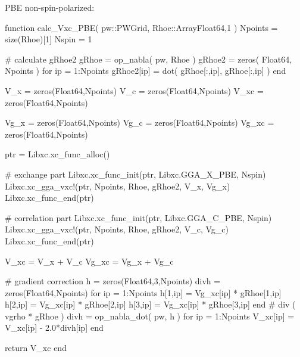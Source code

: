 PBE non-spin-polarized:
\begin{juliacode}
function calc_Vxc_PBE( pw::PWGrid, Rhoe::Array{Float64,1} )
  Npoints = size(Rhoe)[1]
  Nspin = 1

  # calculate gRhoe2
  gRhoe = op_nabla( pw, Rhoe )
  gRhoe2 = zeros( Float64, Npoints )
  for ip = 1:Npoints
    gRhoe2[ip] = dot( gRhoe[:,ip], gRhoe[:,ip] )
  end

  V_x = zeros(Float64,Npoints)
  V_c = zeros(Float64,Npoints)
  V_xc = zeros(Float64,Npoints)

  Vg_x = zeros(Float64,Npoints)
  Vg_c = zeros(Float64,Npoints)
  Vg_xc = zeros(Float64,Npoints)

  ptr = Libxc.xc_func_alloc()

  # exchange part
  Libxc.xc_func_init(ptr, Libxc.GGA_X_PBE, Nspin)
  Libxc.xc_gga_vxc!(ptr, Npoints, Rhoe, gRhoe2, V_x, Vg_x)
  Libxc.xc_func_end(ptr)

  # correlation part
  Libxc.xc_func_init(ptr, Libxc.GGA_C_PBE, Nspin)
  Libxc.xc_gga_vxc!(ptr, Npoints, Rhoe, gRhoe2, V_c, Vg_c)
  Libxc.xc_func_end(ptr)

  V_xc = V_x + V_c
  Vg_xc = Vg_x + Vg_c

  # gradient correction
  h = zeros(Float64,3,Npoints)
  divh = zeros(Float64,Npoints)
  for ip = 1:Npoints
    h[1,ip] = Vg_xc[ip] * gRhoe[1,ip]
    h[2,ip] = Vg_xc[ip] * gRhoe[2,ip]
    h[3,ip] = Vg_xc[ip] * gRhoe[3,ip]
  end
  # div ( vgrho * gRhoe )
  divh = op_nabla_dot( pw, h )
  for ip = 1:Npoints
    V_xc[ip] = V_xc[ip] - 2.0*divh[ip]
  end
  
  return V_xc
end
\end{juliacode}

